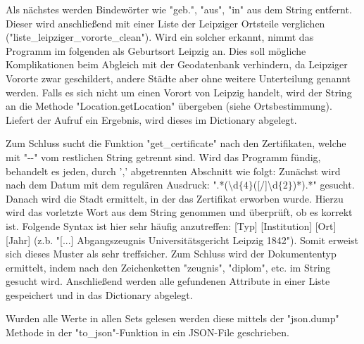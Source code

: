 Als nächstes werden Bindewörter wie "{}geb."{}, "{}aus"{}, "{}in"{} aus dem String entfernt. Dieser wird anschließend mit einer Liste der Leipziger Ortsteile verglichen ("{}liste\_leipziger\_vororte\_clean"{}). Wird ein solcher erkannt, nimmt das Programm im folgenden als Geburtsort Leipzig an. Dies soll mögliche Komplikationen beim Abgleich mit der Geodatenbank verhindern, da Leipziger Vororte zwar geschildert, andere Städte aber ohne weitere Unterteilung genannt werden. Falls es sich nicht um einen Vorort von Leipzig handelt, wird der String an die Methode "{}Location.getLocation"{} übergeben (siehe Ortsbestimmung). Liefert der Aufruf ein Ergebnis, wird dieses im Dictionary abgelegt.

Zum Schluss sucht die Funktion "{}get\_certificate"{} nach den Zertifikaten, welche mit "{}-{}-"{} vom restlichen String getrennt sind. Wird das Programm fündig, behandelt es jeden, durch '{},'{} abgetrennten Abschnitt wie folgt:
Zunächst wird nach dem Datum mit dem regulären Ausdruck: "{}.*(\textbackslash{}d$\{4\}$([/]\textbackslash{}d$\{2\}$)*).*"{} gesucht. Danach wird die Stadt ermittelt, in der das Zertifikat erworben wurde. Hierzu wird das vorletzte Wort aus dem String genommen und überprüft, ob es korrekt ist. Folgende Syntax ist hier sehr häufig anzutreffen: [Typ] [Institution] [Ort] [Jahr] (z.b. "{}[...] Abgangszeugnis Universitätsgericht Leipzig 1842"{}). Somit erweist sich dieses Muster als sehr treffsicher. Zum Schluss wird der Dokumententyp ermittelt, indem nach den Zeichenketten "{}zeugnis"{}, "{}diplom"{}, etc. im String gesucht wird. Anschließend werden alle gefundenen Attribute in einer Liste gespeichert und in das Dictionary abgelegt.

Wurden alle Werte in allen Sets gelesen werden diese mittels der "{}json.dump"{} Methode in der "{}to\_json"{}-Funktion in ein JSON-File geschrieben.
